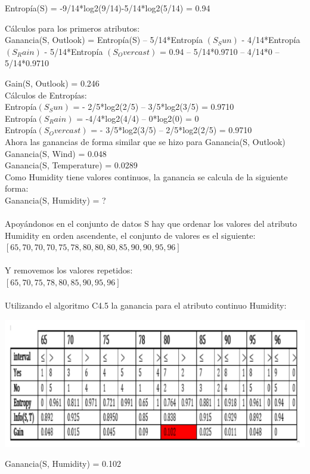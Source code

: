 \documentclass{article}
\begin{document}
Entropía(S) = -9/14*log2(9/14)-5/14*log2(5/14) = 0.94

Cálculos para los primeros atributos:\\
Ganancia(S, Outlook) = Entropía(S) – 5/14*Entropía $(S_Sun)$
					- 4/14*Entropía $(S_Rain)$
					- 5/14*Entropía $(S_Overcast)$
					= 0.94 – 5/14*0.9710 – 4/14*0 – 5/14*0.9710

			Gain(S, Outlook) = 0.246\\

Cálculos de Entropías:\\
Entropía$(S_Sun)$ = - 2/5*log2(2/5) – 3/5*log2(3/5) = 0.9710\\
Entropía$(S_Rain)$ = -4/4*log2(4/4) – 0*log2(0) = 0\\
Entropía$(S_Overcast)$ = - 3/5*log2(3/5) – 2/5*log2(2/5) = 0.9710\\

Ahora las ganancias de forma similar que se hizo para Ganancia(S, Outlook)\\
Ganancia(S, Wind) = 0.048\\
Ganancia(S, Temperature) = 0.0289\\

Como Humidity tiene valores continuos, la ganancia se calcula de la siguiente forma:\\


Ganancia(S, Humidity) = ?\\\\
Apoyándonos en el conjunto de datos S  hay que ordenar los valores del atributo Humidity en orden ascendente, el conjunto de valores es el siguiente:\\
$[65, 70, 70, 70, 75, 78, 80, 80, 80, 85, 90, 90, 95, 96]$\\\\
Y removemos los valores repetidos:\\
$[65, 70, 75, 78, 80, 85, 90, 95, 96]$\\\\
Utilizando el algoritmo C4.5 la ganancia para el atributo continuo Humidity:\\
\begin{center}
 \includegraphics[scale=0.7]{c45}\\
\end{center}
Ganancia(S, Humidity) = 0.102\\
\end{document}
